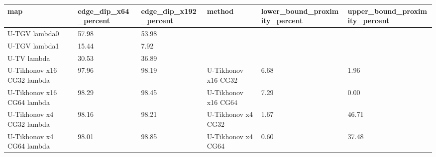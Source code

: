 \begin{tabular}{llllll}
\toprule
map & edge\_dip\_x64\_percent & edge\_dip\_x192\_percent & method & lower\_bound\_proximity\_percent & upper\_bound\_proximity\_percent \\
\midrule
U-TGV lambda0 & 57.98 & 53.98 &  &  &  \\
U-TGV lambda1 & 15.44 & 7.92 &  &  &  \\
U-TV lambda & 30.53 & 36.89 &  &  &  \\
U-Tikhonov x16 CG32 lambda & 97.96 & 98.19 & U-Tikhonov x16 CG32 & 6.68 & 1.96 \\
U-Tikhonov x16 CG64 lambda & 98.29 & 98.45 & U-Tikhonov x16 CG64 & 7.29 & 0.00 \\
U-Tikhonov x4 CG32 lambda & 98.16 & 98.21 & U-Tikhonov x4 CG32 & 1.67 & 46.71 \\
U-Tikhonov x4 CG64 lambda & 98.01 & 98.85 & U-Tikhonov x4 CG64 & 0.60 & 37.48 \\
\bottomrule
\end{tabular}
